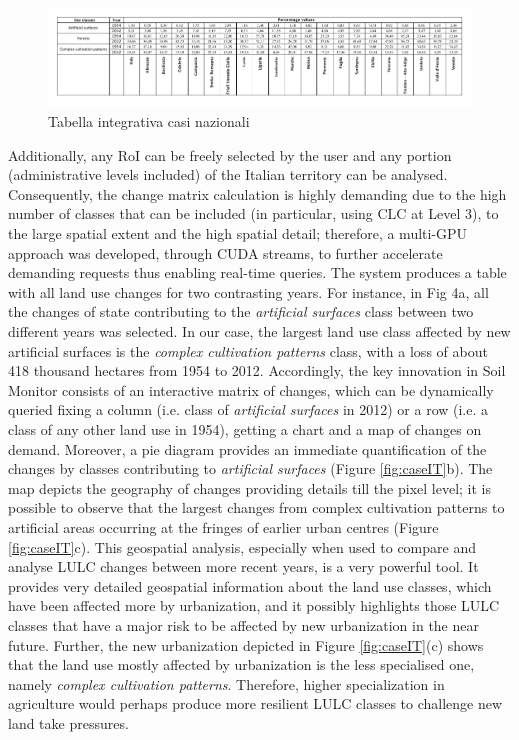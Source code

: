 \documentclass[APA,LATO1COL,doublespace]{WileyNJD-v2}
\begin{document}
\begin{figure}
    \centerline{ \includegraphics[width=450pt]{daMileti/00_tabella_integrativa_caso_nazionale.pdf} }
    \caption{Tabella integrativa casi nazionali}
    \label{fig:caseIT_graphs__waste}
\end{figure}

Additionally, any RoI can be freely selected by the user and any portion (administrative levels included) of the Italian territory can be analysed. Consequently, the change matrix calculation is highly demanding due to the high number of classes that can be included (in particular, using CLC at Level 3), to the large spatial extent and the high spatial detail; therefore, a multi-GPU approach was developed, through CUDA streams, to further accelerate demanding requests thus enabling real-time queries. 
The system produces a table with all land use changes for two contrasting years. 
For instance, in Fig 4a, all the changes of state contributing to the \textit{artificial surfaces} class between two different years was selected. 
In our case, the largest land use class affected by new artificial surfaces is the \textit{complex cultivation patterns} class, with a loss of about 418 thousand hectares from 1954 to 2012. 
Accordingly, the key innovation in Soil Monitor consists of an interactive matrix of changes, which can be dynamically queried fixing a column (i.e. class of \textit{artificial surfaces} in 2012) or a row (i.e. a class of any other land use in 1954), getting a chart and a map of changes on demand. 
Moreover, a pie diagram provides an immediate quantification of the changes by classes contributing to \textit{artificial surfaces} (Figure \ref{fig:caseIT}b). 
The map depicts the geography of changes providing details till the pixel level; it is possible to observe that the largest changes from complex cultivation patterns to artificial areas occurring at the fringes of earlier urban centres (Figure \ref{fig:caseIT}c). 
This geospatial analysis, especially when used to compare and analyse LULC changes between more recent years, is a very powerful tool. 
It provides very detailed geospatial information about the land use classes, which have been affected more by urbanization, and it possibly highlights those LULC classes that have a major risk to be affected by new urbanization in the near future. 
Further, the new urbanization depicted in Figure \ref{fig:caseIT}(c) shows that the land use mostly affected by urbanization is the less specialised one, namely \textit{complex cultivation patterns}. 
Therefore, higher specialization in agriculture would perhaps produce more resilient LULC classes to challenge new land take pressures.
\end{document}

